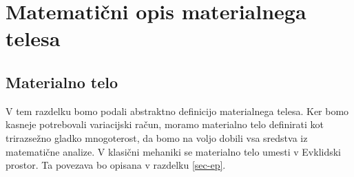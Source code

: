 \chapter{Matematični opis materialnega telesa}

\section{Materialno telo}

V tem razdelku bomo podali abstraktno definicijo materialnega telesa. Ker bomo kasneje
potrebovali variacijski račun, moramo materialno telo definirati kot trirazsežno gladko
mnogoterost, da bomo na voljo dobili vsa sredstva iz matematične analize.
V klasični mehaniki se materialno telo umesti v Evklidski prostor. Ta povezava bo opisana v razdelku
\ref{sec-ep}.

